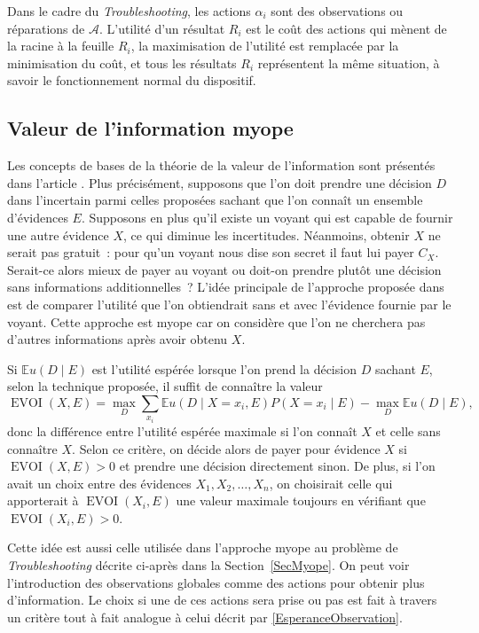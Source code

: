 \documentclass[a4paper,11pt]{article}
\theoremstyle{plain}
\theoremstyle{definition}
\DeclareMathOperator{\EVOI}{EVOI}
\begin{document}
Dans le cadre du \emph{Troubleshooting}, les actions $\alpha_i$ sont des observations ou réparations de $\mathcal A$. L'utilité d'un résultat $R_i$ est le coût des actions qui mènent de la racine à la feuille $R_i$, la maximisation de l'utilité est remplacée par la minimisation du coût, et tous les résultats $R_i$ représentent la même situation, à savoir le fonctionnement normal du dispositif.

\subsection{Valeur de l'information myope}
\label{SecValeurInformation}

Les concepts de bases de la théorie de la valeur de l'information sont présentés dans l'article \cite{howard_information_1966}. Plus précisément, supposons que l'on doit prendre une décision $D$ dans l'incertain parmi celles proposées sachant que l'on connaît un ensemble d'évidences $E$. Supposons en plus qu'il existe un voyant qui est capable de fournir une autre évidence $X$, ce qui diminue les incertitudes. Néanmoins, obtenir $X$ ne serait pas gratuit~: pour qu'un voyant nous dise son secret il faut lui payer $C_X$. Serait-ce alors mieux de payer au voyant ou doit-on prendre plutôt une décision sans informations additionnelles~? L'idée principale de l'approche proposée dans \cite{howard_information_1966} est de comparer l'utilité que l'on obtiendrait sans et avec l'évidence fournie par le voyant. Cette approche est myope car on considère que l'on ne cherchera pas d'autres informations après avoir obtenu $X$.

Si $\mathbb E u(D \mid E)$ est l'utilité espérée lorsque l'on prend la décision $D$ sachant $E$, selon la technique proposée, il suffit de connaître la valeur
\begin{equation}
\label{EsperanceObservation}
\EVOI(X, E) = \max_{D} \sum_{x_i} \mathbb E u(D \mid X = x_i, E) P(X = x_i \mid E) - \max_{D} \mathbb E u(D \mid E),
\end{equation}
donc la différence entre l'utilité espérée maximale si l'on connaît $X$ et celle sans connaître $X$. Selon ce critère, on décide alors de payer pour évidence $X$ si $\EVOI(X, E) > 0$ et prendre une décision directement sinon. De plus, si l'on avait un choix entre des évidences $X_1, X_2, \dotsc, X_n$, on choisirait celle qui apporterait à $\EVOI(X_i, E)$ une valeur maximale toujours en vérifiant que $\EVOI(X_i, E) > 0$.

Cette idée est aussi celle utilisée dans l'approche myope au problème de \emph{Troubleshooting} décrite ci-après dans la Section~\ref{SecMyope}. On peut voir l'introduction des observations globales comme des actions pour obtenir plus d'information. Le choix si une de ces actions sera prise ou pas est fait à travers un critère tout à fait analogue à celui décrit par \eqref{EsperanceObservation}.
\end{document}
